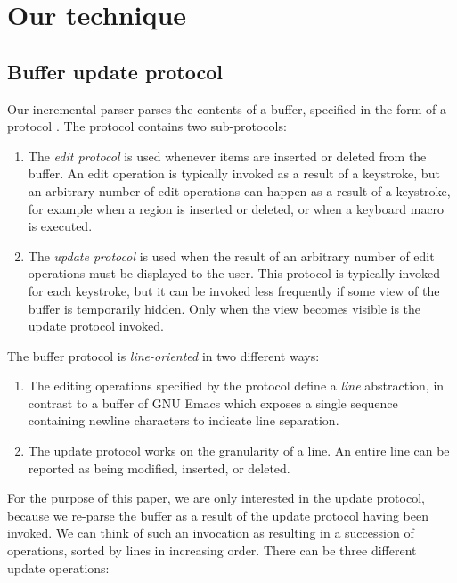 \section{Our technique}

\subsection{Buffer update protocol}
\label{sec-buffer-update-protocol}

Our incremental parser parses the contents of a buffer, specified in
the form of a \clos{} protocol
\cite{Strandh:2016:CPE:3005729.3005732}.  The protocol contains two
sub-protocols:

\begin{enumerate}
\item The \emph{edit protocol} is used whenever items are inserted or
  deleted from the buffer.  An edit operation is typically invoked as
  a result of a keystroke, but an arbitrary number of edit operations
  can happen as a result of a keystroke, for example when a region is
  inserted or deleted, or when a keyboard macro is executed.
\item The \emph{update protocol} is used when the result of an
  arbitrary number of edit operations must be displayed to the user.
  This protocol is typically invoked for each keystroke, but it can be
  invoked less frequently if some view of the buffer is temporarily
  hidden.  Only when the view becomes visible is the update protocol
  invoked.
\end{enumerate}

The buffer protocol is \emph{line-oriented} in two different ways:

\begin{enumerate}
\item The editing operations specified by the protocol define a
  \emph{line} abstraction, in contrast to a buffer of GNU Emacs
  \cite{Finseth:1980:TPTa} which exposes a single sequence containing
  newline characters to indicate line separation.
\item The update protocol works on the granularity of a line.  An
  entire line can be reported as being modified, inserted, or
  deleted.
\end{enumerate}

For the purpose of this paper, we are only interested in the update
protocol, because we re-parse the buffer as a result of the update
protocol having been invoked.  We can think of such an invocation as
resulting in a succession of operations, sorted by lines in increasing
order.  There can be three different update operations:


